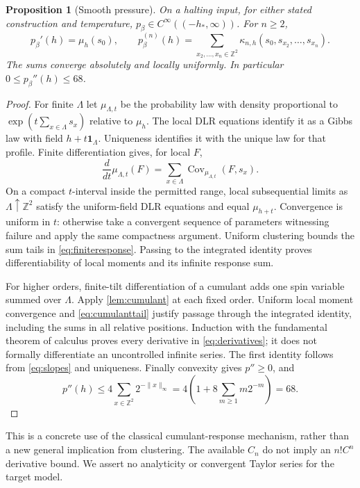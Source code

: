 \documentclass[11pt,reqno]{amsart}
\numberwithin{equation}{section}
\newtheorem{proposition}[theorem]{Proposition}
\theoremstyle{definition}
\theoremstyle{remark}
\newcommand{\Z}{\mathbb Z}
\newcommand{\one}{\mathbf1}
\newcommand{\Cov}{\operatorname{Cov}}
\newcommand{\norm}[1]{\lVert#1\rVert}
\begin{document}
\begin{proposition}[Smooth pressure]\label{prop:smooth}
On a halting input, for either stated construction and temperature,
$p_\beta\in C^\infty((-h_*,\infty))$. For $n\geq2$,
\begin{equation}\label{eq:derivatives}
 p_\beta'(h)=\mu_h(s_0),\qquad
 p_\beta^{(n)}(h)=\sum_{x_2,\ldots,x_n\in\Z^2}
 \kappa_{n,h}(s_0,s_{x_2},\ldots,s_{x_n}).
\end{equation}
The sums converge absolutely and locally uniformly. In particular $0\leq p_\beta''(h)\leq68$.
\end{proposition}
\begin{proof}
For finite $\Lambda$ let $\mu_{\Lambda,t}$ be the probability law with density proportional to $\exp(t\sum_{x\in\Lambda}s_x)$ relative to $\mu_h$. The local DLR equations identify it as a Gibbs law with field $h+t\one_\Lambda$. Uniqueness identifies it with the unique law for that profile. Finite differentiation gives, for local $F$,
\begin{equation}\label{eq:finiteresponse}
 \frac d{dt}\mu_{\Lambda,t}(F)
 =\sum_{x\in\Lambda}\Cov_{\mu_{\Lambda,t}}(F,s_x).
\end{equation}
On a compact $t$-interval inside the permitted range, local subsequential limits as $\Lambda\uparrow\Z^2$ satisfy the uniform-field DLR equations and equal $\mu_{h+t}$. Convergence is uniform in $t$: otherwise take a convergent sequence of parameters witnessing failure and apply the same compactness argument. Uniform clustering bounds the sum tails in \eqref{eq:finiteresponse}. Passing to the integrated identity proves differentiability of local moments and its infinite response sum.

For higher orders, finite-tilt differentiation of a cumulant adds one spin variable summed over $\Lambda$. Apply \cref{lem:cumulant} at each fixed order. Uniform local moment convergence and \eqref{eq:cumulanttail} justify passage through the integrated identity, including the sums in all relative positions. Induction with the fundamental theorem of calculus proves every derivative in \eqref{eq:derivatives}; it does not formally differentiate an uncontrolled infinite series. The first identity follows from \eqref{eq:slopes} and uniqueness. Finally convexity gives $p''\geq0$, and
\[
 p''(h)\leq4\sum_{x\in\Z^2}2^{-\norm x_\infty}
 =4\left(1+8\sum_{m\geq1}m2^{-m}\right)=68.
\]
\end{proof}

This is a concrete use of the classical cumulant-response mechanism, rather than a new general implication from clustering. The available $C_n$ do not imply an $n!C^n$ derivative bound. We assert no analyticity or convergent Taylor series for the target model.
\end{document}

